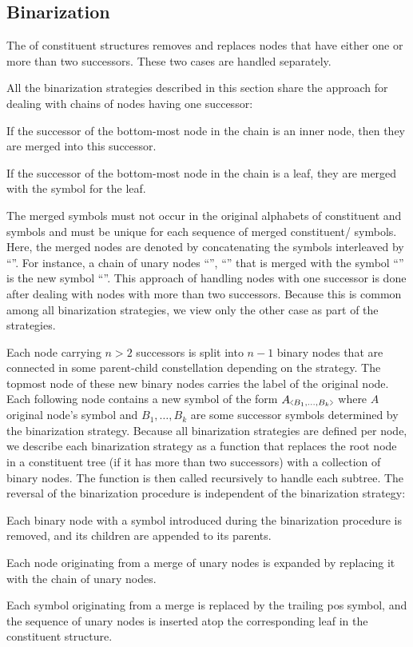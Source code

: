 \documentclass[../../document.tex]{subfiles}
\begin{document}
    \subsection{Binarization}\label{sec:binarization}
    The  of constituent structures removes and replaces nodes that have either one or more than two successors.
    These two cases are handled separately.

    All the binarization strategies described in this section share the approach for dealing with chains of nodes having one successor:
    \begin{inparaenum}
        \item If the successor of the bottom-most node in the chain is an inner node, then they are merged into this successor.
        \item If the successor of the bottom-most node in the chain is a leaf, they are merged with the  symbol for the leaf.
    \end{inparaenum}
    The merged symbols must not occur in the original alphabets of constituent and  symbols and must be unique for each sequence of merged constituent/ symbols.
    Here, the merged nodes are denoted by concatenating the symbols interleaved by ``\cn{+}''.
    For instance, a chain of unary nodes ``'', ``'' that is merged with the  symbol ``'' is the new symbol ``''.
    This approach of handling nodes with one successor is done after dealing with nodes with more than two successors.
    Because this is common among all binarization strategies, we view only the other case as part of the strategies.

    Each node carrying \( n > 2 \) successors is split into \( n-1 \) binary nodes that are connected in some parent-child constellation depending on the strategy.
    The topmost node of these new binary nodes carries the label of the original node.
    Each following node contains a new symbol of the form \(A\binsym{B_1, \ldots, B_k}\) where \(A\) original node's symbol and \(B_1, \ldots, B_k\) are some successor symbols determined by the binarization strategy.
    Because all binarization strategies are defined per node, we describe each binarization strategy as a function that replaces the root node in a constituent tree (if it has more than two successors) with a collection of binary nodes.
    The function is then called recursively to handle each subtree.
    The reversal of the binarization procedure is independent of the binarization strategy:
    \begin{compactenum}
        \item Each binary node with a symbol introduced during the binarization procedure is removed, and its children are appended to its parents.
        \item Each node originating from a merge of unary nodes is expanded by replacing it with the chain of unary nodes.
        \item Each  symbol originating from a merge is replaced by the trailing pos symbol, and the sequence of unary nodes is inserted atop the corresponding leaf in the constituent structure.
    \end{compactenum}
\end{document}

